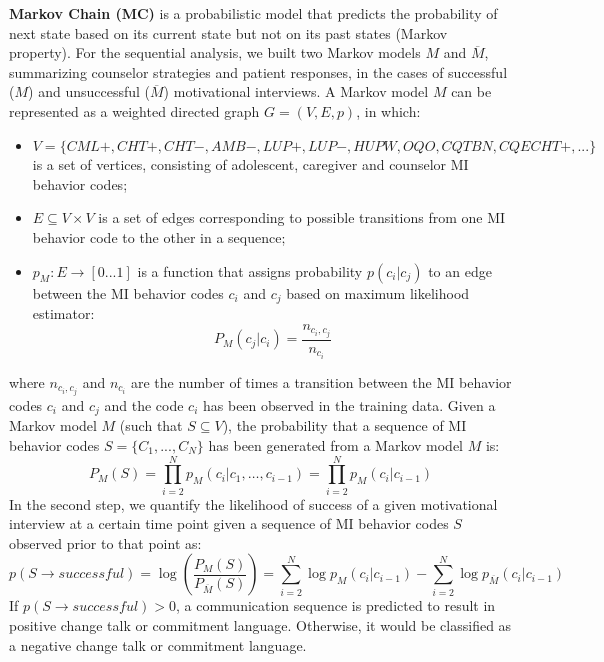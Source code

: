 \documentclass{amia_summit_2018}
\begin{document}
\textbf {Markov Chain (MC)} is a probabilistic model that predicts the probability of next state based on its current state but not on its past states (Markov property). For the sequential analysis,
we built two Markov models $M$ and $\overline{M}$, summarizing counselor strategies and patient responses, in the cases of successful ($M$) and unsuccessful ($\overline{M}$) motivational interviews. A
Markov model $M$ can be represented as a weighted directed graph $G = (V, E, p)$, in which:
\begin{itemize}
\item $V = \{CML+, CHT+, CHT-, AMB-, LUP+, LUP-, HUPW, OQO, CQTBN, CQECHT+,...\}$ is a set of vertices, consisting of adolescent, caregiver and counselor MI behavior codes;
\item $E \subseteq V \times V$ is a set of edges corresponding to possible transitions from one MI behavior code to the other in a sequence;
\item $p_M:E\rightarrow[0...1]$ is a function that assigns probability $p(c_i|c_j)$ to an edge between the MI behavior codes $c_i$ and $c_j$ based on maximum likelihood estimator:
\begin{equation}
P_M(c_j|c_i) = \frac{n_{c_i,c_j}}{n_{c_i}}
\end{equation}
\end{itemize}
where $n_{c_i,c_j}$ and $n_{c_i}$ are the number of times a transition between the MI behavior codes $c_i$ and $c_j$ and the code $c_i$ has been observed in the training data. Given a Markov model $M$ (such that $S\subseteq V$), the probability that a sequence of MI behavior codes $S = \{C_1,...,C_N\}$ has been generated from a Markov model $M$ is:
\begin{equation}
P_M(S) = \prod_{i=2}^N p_M(c_i|c_1,\dots,c_{i-1})=\prod_{i=2}^N p_M(c_i|c_{i-1})
\end{equation}
In the second step, we quantify the likelihood of success of a given motivational interview at a certain time point given a sequence of MI behavior codes $S$ observed prior to that point as:
\begin{equation}
p(S\rightarrow successful) = \log\left(\frac{P_M(S)}{P_{\overline M}(S)}\right)= \sum_{i=2}^N \log p_M(c_i|c_{i-1})-\sum_{i=2}^N \log p_{\overline M}(c_i|c_{i-1})\label{eq:class}
\end{equation}
If $p(S\rightarrow successful) > 0 $, a communication sequence is predicted to result in positive change talk or commitment language. Otherwise, it would be classified as a negative change talk or
commitment language.
\end{document}
